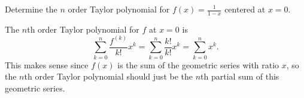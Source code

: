 \begin{activitySolution}
    \item  Determine the $n$ order Taylor polynomial for $f(x) = \frac{1}{1-x}$ centered at $x=0$.

The $n$th order Taylor polynomial for $f$ at $x=0$ is
\[\sum_{k=0}^n \frac{f^{(k)}}{k!} x^k = \sum_{k=0}^n \frac{k!}{k!} x^k = \sum_{k=0}^n  x^k.\]
This makes sense since $f(x)$ is the sum of the geometric series with ratio $x$, so the $n$th order Taylor polynomial should just be the $n$th partial sum of this geometric series.

    \etl
\ea
\end{activitySolution}
\aftera 